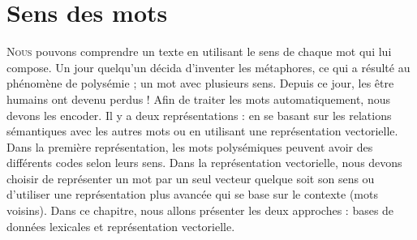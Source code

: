 \documentclass{KodeBook}
\begin{document}
		\mainmatter
	
\fi
\chapter{Sens des mots}

\begin{introduction}
	\lettrine{N}{ous} pouvons comprendre un texte en utilisant le sens de chaque mot qui lui compose. 
	Un jour quelqu'un décida d'inventer les métaphores, ce qui a résulté au phénomène de polysémie ; un mot avec plusieurs sens. 
	Depuis ce jour, les être humains ont devenu perdus ! 
	Afin de traiter les mots automatiquement, nous devons les encoder.
	Il y a deux représentations : en se basant sur les relations sémantiques avec les autres mots ou en utilisant une représentation vectorielle. 
	Dans la première représentation, les mots polysémiques peuvent avoir des différents codes selon leurs sens. 
	Dans la représentation vectorielle, nous devons choisir de représenter un mot par un seul vecteur quelque soit son sens ou d'utiliser une représentation plus avancée qui se base sur le contexte (mots voisins).
	Dans ce chapitre, nous allons présenter les deux approches : bases de données lexicales et représentation vectorielle.
\end{introduction} 
\end{document}

